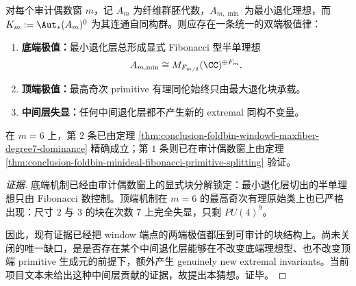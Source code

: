 \begin{conjecture}[偶数审计窗的双端极值支配原则]\label{conj:conclusion-audited-even-window-dual-end-extremal-principle}
对每个审计偶数窗 \(m\)，记 \(A_m\) 为纤维群胚代数，\(A_{m,\min}\) 为最小退化理想，而 \(K_m:=\Aut_{\ast}(A_m)^0\) 为其连通自同构群。则应存在一条统一的双端极值律：
\begin{enumerate}
  \item \textbf{底端极值：}最小退化层总形成显式 Fibonacci 型半单理想
  \[
  A_{m,\min}\cong M_{F_{m/2}}(\CC)^{\oplus F_m}.
  \]
  \item \textbf{顶端极值：}最高奇次 primitive 有理同伦始终只由最大退化块承载。
  \item \textbf{中间层失显：}任何中间退化层都不产生新的 extremal 同构不变量。
\end{enumerate}
在 \(m=6\) 上，第 \(2\) 条已由定理 \ref{thm:conclusion-foldbin-window6-maxfiber-degree7-dominance} 精确成立；第 \(1\) 条则已在审计偶数窗上由定理 \ref{thm:conclusion-foldbin-minideal-fibonacci-primitive-splitting} 验证。
\end{conjecture}
\begin{proof}[证据]
底端机制已经由审计偶数窗上的显式块分解锁定：最小退化层切出的半单理想只由 Fibonacci 数控制。顶端机制在 \(m=6\) 的最高奇次有理原始类上也已严格出现：尺寸 \(2\) 与 \(3\) 的块在次数 \(7\) 上完全失显，只剩 \(PU(4)^9\)。

因此，现有证据已经把 window 端点的两端极值都压到可审计的块结构上。尚未关闭的唯一缺口，是是否存在某个中间退化层能够在不改变底端理想型、也不改变顶端 primitive 生成元的前提下，额外产生 genuinely new extremal invariants。当前项目文本未给出这种中间层贡献的证据，故提出本猜想。证毕。
\end{proof}
